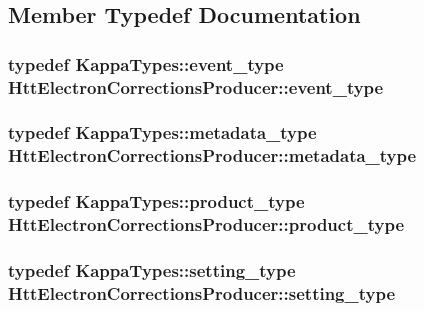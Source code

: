 \subsection{Member Typedef Documentation}
\hypertarget{classHttElectronCorrectionsProducer_a7972baeb26d5c7003099092fe30db215}{
\subsubsection[{event\_\-type}]{\setlength{\rightskip}{0pt plus 5cm}typedef KappaTypes::event\_\-type {\bf HttElectronCorrectionsProducer::event\_\-type}}}
\label{classHttElectronCorrectionsProducer_a7972baeb26d5c7003099092fe30db215}
\hypertarget{classHttElectronCorrectionsProducer_a956e67f1c2b74330fe6da6e5dad3eb50}{
\subsubsection[{metadata\_\-type}]{\setlength{\rightskip}{0pt plus 5cm}typedef KappaTypes::metadata\_\-type {\bf HttElectronCorrectionsProducer::metadata\_\-type}}}
\label{classHttElectronCorrectionsProducer_a956e67f1c2b74330fe6da6e5dad3eb50}
\hypertarget{classHttElectronCorrectionsProducer_a3e393b3f94ee4c60d6bbb9bc5fb33416}{
\subsubsection[{product\_\-type}]{\setlength{\rightskip}{0pt plus 5cm}typedef KappaTypes::product\_\-type {\bf HttElectronCorrectionsProducer::product\_\-type}}}
\label{classHttElectronCorrectionsProducer_a3e393b3f94ee4c60d6bbb9bc5fb33416}
\hypertarget{classHttElectronCorrectionsProducer_a7e0458045a229bf4cdb7dbdc488078be}{
\subsubsection[{setting\_\-type}]{\setlength{\rightskip}{0pt plus 5cm}typedef KappaTypes::setting\_\-type {\bf HttElectronCorrectionsProducer::setting\_\-type}}}
